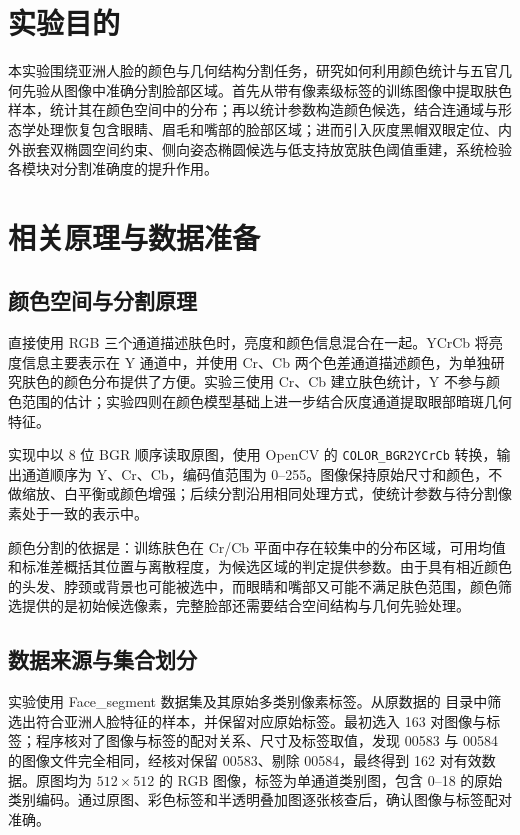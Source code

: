 \section{实验目的}

本实验围绕亚洲人脸的颜色与几何结构分割任务，研究如何利用颜色统计与五官几何先验从图像中准确分割脸部区域。首先从带有像素级标签的训练图像中提取肤色样本，统计其在颜色空间中的分布；再以统计参数构造颜色候选，结合连通域与形态学处理恢复包含眼睛、眉毛和嘴部的脸部区域；进而引入灰度黑帽双眼定位、内外嵌套双椭圆空间约束、侧向姿态椭圆候选与低支持放宽肤色阈值重建，系统检验各模块对分割准确度的提升作用。

\section{相关原理与数据准备}
\subsection{颜色空间与分割原理}

直接使用 RGB 三个通道描述肤色时，亮度和颜色信息混合在一起。YCrCb 将亮度信息主要表示在 Y 通道中，并使用 Cr、Cb 两个色差通道描述颜色，为单独研究肤色的颜色分布提供了方便。实验三使用 Cr、Cb 建立肤色统计，Y 不参与颜色范围的估计；实验四则在颜色模型基础上进一步结合灰度通道提取眼部暗斑几何特征。

实现中以 8 位 BGR 顺序读取原图，使用 OpenCV 的 \texttt{COLOR\_BGR2YCrCb} 转换，输出通道顺序为 Y、Cr、Cb，编码值范围为 0--255。图像保持原始尺寸和颜色，不做缩放、白平衡或颜色增强；后续分割沿用相同处理方式，使统计参数与待分割像素处于一致的表示中。

颜色分割的依据是：训练肤色在 Cr/Cb 平面中存在较集中的分布区域，可用均值和标准差概括其位置与离散程度，为候选区域的判定提供参数。由于具有相近颜色的头发、脖颈或背景也可能被选中，而眼睛和嘴部又可能不满足肤色范围，颜色筛选提供的是初始候选像素，完整脸部还需要结合空间结构与几何先验处理。

\subsection{数据来源与集合划分}

实验使用 Face\_segment 数据集及其原始多类别像素标签。从原数据的  目录中筛选出符合亚洲人脸特征的样本，并保留对应原始标签。最初选入 163 对图像与标签；程序核对了图像与标签的配对关系、尺寸及标签取值，发现 00583 与 00584 的图像文件完全相同，经核对保留 00583、剔除 00584，最终得到 162 对有效数据。原图均为 $512\times512$ 的 RGB 图像，标签为单通道类别图，包含 0--18 的原始类别编码。通过原图、彩色标签和半透明叠加图逐张核查后，确认图像与标签配对准确。


